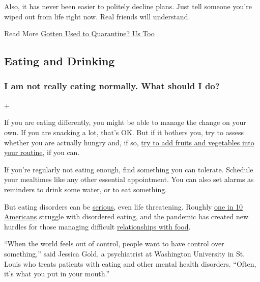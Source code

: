 Also, it has never been easier to politely decline plans. Just tell
someone you're wiped out from life right now. Real friends will
understand.

Read More
\href{https://www.nytimes3xbfgragh.onion/2020/06/27/at-home/manage-your-coronavirus-anxiety.html}{Gotten
Used to Quarantine? Us Too}

\hypertarget{eating-and-drinking}{%
\subsection{Eating and Drinking}\label{eating-and-drinking}}

\hypertarget{i-am-not-really-eating-normally-what-should-i-do}{%
\subsubsection{I am not really eating normally. What should I
do?}\label{i-am-not-really-eating-normally-what-should-i-do}}

+

If you are eating differently, you might be able to manage the change on
your own. If you are snacking a lot, that's OK. But if it bothers you,
try to assess whether you are actually hungry and, if so,
\href{https://www.nytimes3xbfgragh.onion/2020/04/20/well/eat/coronavirus-diet-metabolic-health.html}{try
to add fruits and vegetables into your routine}, if you can.

If you're regularly not eating enough, find something you can tolerate.
Schedule your mealtimes like any other essential appointment. You can
also set alarms as reminders to drink some water, or to eat something.

But eating disorders can be
\href{https://www.nytimes3xbfgragh.onion/2020/05/03/sports/athletes-eating-disorders.html}{serious},
even life threatening. Roughly
\href{http://eatingdisorderscoalition.org.s208556.gridserver.com/couch/uploads/file/Eating\%20Disorders\%20Fact\%20Sheet.pdf}{one
in 10 Americans} struggle with disordered eating, and the pandemic has
created new hurdles for those managing difficult
\href{https://www.nytimes3xbfgragh.onion/2020/05/12/well/mind/i-have-an-eating-disorder-but-cant-escape-the-kitchen.html}{relationships
with food}.

``When the world feels out of control, people want to have control over
something,'' said Jessica Gold, a psychiatrist at Washington University
in St. Louis who treats patients with eating and other mental health
disorders. ``Often, it's what you put in your mouth.''

